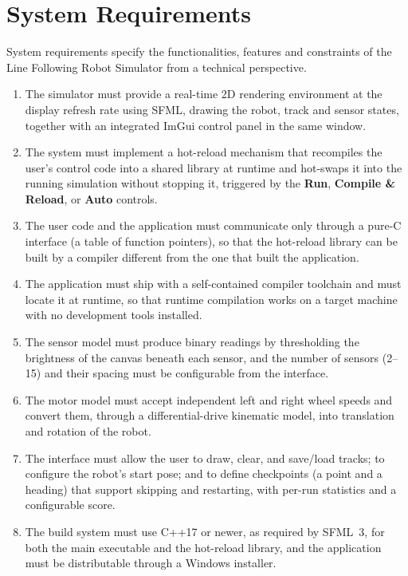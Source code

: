 \section{System Requirements}
System requirements specify the functionalities, features and constraints of the Line Following Robot Simulator from a technical perspective.

\begin{enumerate}
    \item The simulator must provide a real-time 2D rendering environment at the display refresh rate using SFML, drawing the robot, track and sensor states, together with an integrated ImGui control panel in the same window.

    \item The system must implement a hot-reload mechanism that recompiles the user's control code into a shared library at runtime and hot-swaps it into the running simulation without stopping it, triggered by the \textbf{Run}, \textbf{Compile \& Reload}, or \textbf{Auto} controls.

    \item The user code and the application must communicate only through a pure-C interface (a table of function pointers), so that the hot-reload library can be built by a compiler different from the one that built the application.

    \item The application must ship with a self-contained compiler toolchain and must locate it at runtime, so that runtime compilation works on a target machine with no development tools installed.

    \item The sensor model must produce binary readings by thresholding the brightness of the canvas beneath each sensor, and the number of sensors (2--15) and their spacing must be configurable from the interface.

    \item The motor model must accept independent left and right wheel speeds and convert them, through a differential-drive kinematic model, into translation and rotation of the robot.

    \item The interface must allow the user to draw, clear, and save/load tracks; to configure the robot's start pose; and to define checkpoints (a point and a heading) that support skipping and restarting, with per-run statistics and a configurable score.

    \item The build system must use C++17 or newer, as required by SFML~3, for both the main executable and the hot-reload library, and the application must be distributable through a Windows installer.
\end{enumerate}

